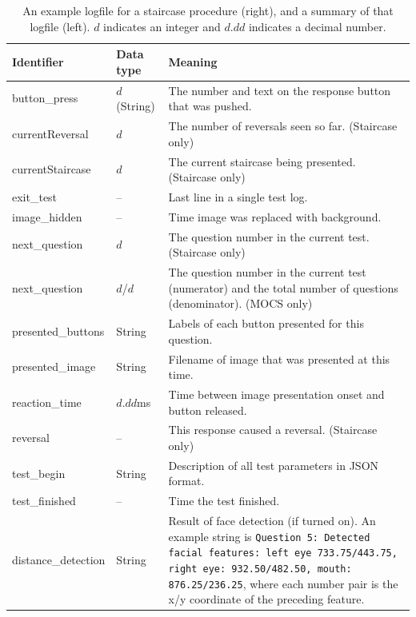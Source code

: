 \documentclass{article}
\begin{document}
\begin{table}
\begin{center}
\begin{tabular}{llp{10cm}}
\hline
Identifier & Data type & Meaning \\
\hline
button\_press       & $d$ (String) &  The number and text on the response button that was pushed. \\
currentReversal     & $d$ & The number of reversals seen so far. (Staircase only)\\
currentStaircase    & $d$ & The current staircase being presented. (Staircase only)\\
exit\_test          &  --  & Last line in a single test log. \\
image\_hidden       &  --  & Time image was replaced with background. \\
next\_question      & $d$ & The question number in the current test. (Staircase only)\\
next\_question      & $d$/$d$ & The question number in the current test (numerator) 
                                and the total number of questions (denominator). (MOCS only)\\
presented\_buttons  & String & Labels of each button presented for this question. \\
presented\_image    & String & Filename of image that was presented at this time. \\
reaction\_time      & $d.dd$ms & Time between image presentation onset and button released. \\
reversal            & -- & This response caused a reversal. (Staircase only) \\
test\_begin         & String & Description of all test parameters in JSON format. \\
test\_finished      &  -- & Time the test finished.\\
distance\_detection & String & Result of face detection (if turned on). 
                    An example string is {\tt Question 5: Detected facial 
                    features: left eye 733.75/443.75, right eye: 932.50/482.50,
                    mouth: 876.25/236.25}, where each number pair is the x/y 
                    coordinate of the preceding feature.\\
\hline
\end{tabular}
\caption{\label{tab-logs}An example logfile for a staircase procedure (right), and a summary of that logfile (left).
$d$ indicates an integer and $d.dd$ indicates a decimal number.
}
\end{center}
\end{table}
\end{document}

